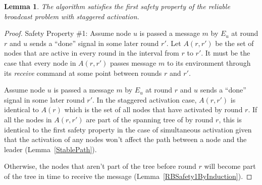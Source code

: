 \documentclass[english]{article}
\newtheorem{lemma}[theorem]{Lemma}
\begin{document}
\begin{lemma}
\label{StaggeredRBSafety1}
The algorithm satisfies the first safety property of the reliable broadcast problem with staggered activation.
\end{lemma}
\begin{proof}
Safety Property \#1: Assume node $u$ is passed a message $m$ by $E_u$ at round $r$ and $u$ sends  a ``done'' signal in some later round $r'$. Let $A(r,r')$ be the set of nodes that are active in every round in the interval from $r$ to $r'$. It must be the case that every node in $A(r,r')$ passes message $m$ to its environment through its \textit{receive} command at some point between rounds $r$ and $r'$. 

Assume node $u$ is passed a message $m$ by $E_u$ at round $r$ and $u$ sends  a ``done'' signal in some later round $r'$.
In the staggered activation case, $A(r,r')$ is identical to $A(r)$ which is the set of all nodes that have activated by round $r$. If all the nodes in $A(r,r')$ are part of the spanning tree of by round $r$, this is identical to the first safety property in the case of simultaneous activation given that the activation of any nodes won't affect the path between a node and the leader (Lemma~\ref{StablePath}). 

Otherwise, the nodes that aren't part of the tree before round $r$ will become part of the tree in time to receive the message (Lemma~\ref{RBSafety1ByInduction}). 

\end{proof}
\end{document}
